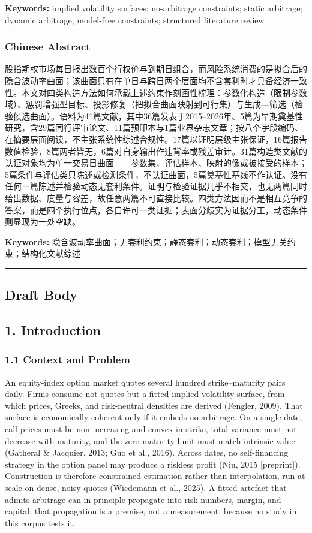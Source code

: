 \documentclass[11pt]{article}
\begin{document}
\textbf{Keywords:} implied volatility surfaces; no-arbitrage constraints; static arbitrage; dynamic arbitrage; model-free constraints; structured literature review

\newpage
\subsubsection*{Chinese Abstract}
股指期权市场每日报出数百个行权价与到期日组合，而风险系统消费的是拟合后的隐含波动率曲面；该曲面只有在单日与跨日两个层面均不含套利时才具备经济一致性。本文对四类构造方法如何承载上述约束作刻画性梳理：参数化构造（限制参数域）、惩罚增强型目标、投影修复（把拟合曲面映射到可行集）与生成—筛选（检验候选曲面）。语料为41篇文献，其中36篇发表于2015–2026年、5篇为早期奠基性研究，含29篇同行评审论文、11篇预印本与1篇业界杂志文章；按八个字段编码、在摘要层面阅读，不主张系统性综述合规性。17篇以证明层级主张保证，16篇报告数值检验，8篇两者皆无，6篇对自身输出作违背率或残差审计。31篇构造类文献的认证对象均为单一交易日曲面——参数集、评估样本、映射的像或被接受的样本；5篇条件与评估类只陈述或检测条件，不认证曲面，5篇奠基性基线不作认证。没有任何一篇陈述并检验动态无套利条件。证明与检验证据几乎不相交，也无两篇同时给出数据、度量与容差，故任意两篇不可直接比较。四类方法因而不是相互竞争的答案，而是四个执行位点，各自许可一类证据；表面分歧实为证据分工，动态条件则显现为一处空缺。

\textbf{Keywords:} 隐含波动率曲面；无套利约束；静态套利；动态套利；模型无关约束；结构化文献综述

\par\medskip\hrule\medskip
\subsection*{Draft Body}
\subsection*{1. Introduction}
\subsubsection*{1.1 Context and Problem}
An equity-index option market quotes several hundred strike–maturity pairs daily. Firms consume not quotes but a fitted implied-volatility surface, from which prices, Greeks, and risk-neutral densities are derived (Fengler, 2009). That surface is economically coherent only if it embeds no arbitrage. On a single date, call prices must be non-increasing and convex in strike, total variance must not decrease with maturity, and the zero-maturity limit must match intrinsic value (Gatheral \& Jacquier, 2013; Guo et al., 2016). Across dates, no self-financing strategy in the option panel may produce a riskless profit (Niu, 2015 [preprint]). Construction is therefore constrained estimation rather than interpolation, run at scale on dense, noisy quotes (Wiedemann et al., 2025). A fitted artefact that admits arbitrage can in principle propagate into risk numbers, margin, and capital; that propagation is a premise, not a measurement, because no study in this corpus tests it.
\end{document}
